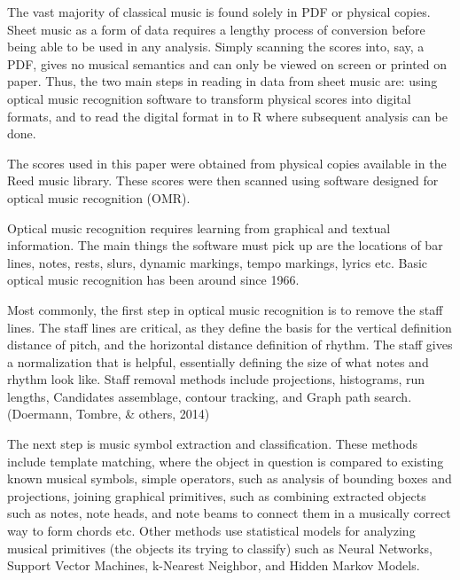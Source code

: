 \documentclass[12pt,twoside]{reedthesis}
\theoremstyle{definition}
\theoremstyle{definition}
\theoremstyle{definition}
\theoremstyle{remark}
\begin{document}
The vast majority of classical music is found solely in PDF or physical
copies. Sheet music as a form of data requires a lengthy process of
conversion before being able to be used in any analysis. Simply scanning
the scores into, say, a PDF, gives no musical semantics and can only be
viewed on screen or printed on paper. Thus, the two main steps in
reading in data from sheet music are: using optical music recognition
software to transform physical scores into digital formats, and to read
the digital format in to R where subsequent analysis can be done.

The scores used in this paper were obtained from physical copies
available in the Reed music library. These scores were then scanned
using software designed for optical music recognition (OMR).

Optical music recognition requires learning from graphical and textual
information. The main things the software must pick up are the locations
of bar lines, notes, rests, slurs, dynamic markings, tempo markings,
lyrics etc. Basic optical music recognition has been around since 1966.

Most commonly, the first step in optical music recognition is to remove
the staff lines. The staff lines are critical, as they define the basis
for the vertical definition distance of pitch, and the horizontal
distance definition of rhythm. The staff gives a normalization that is
helpful, essentially defining the size of what notes and rhythm look
like. Staff removal methods include projections, histograms, run
lengths, Candidates assemblage, contour tracking, and Graph path search.
(Doermann, Tombre, \& others, 2014)

The next step is music symbol extraction and classification. These
methods include template matching, where the object in question is
compared to existing known musical symbols, simple operators, such as
analysis of bounding boxes and projections, joining graphical
primitives, such as combining extracted objects such as notes, note
heads, and note beams to connect them in a musically correct way to form
chords etc. Other methods use statistical models for analyzing musical
primitives (the objects its trying to classify) such as Neural Networks,
Support Vector Machines, k-Nearest Neighbor, and Hidden Markov Models.
\end{document}
